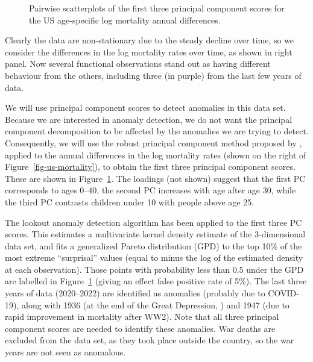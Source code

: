 \documentclass[
  11pt,
  a4paper,
]{article}
\begin{document}
\begin{figure}[!htb]


\caption{\label{fig-pca-scores}Pairwise scatterplots of the first three
principal component scores for the US age-specific log mortality annual
differences.}

\end{figure}%

Clearly the data are non-stationary due to the steady decline over time,
so we consider the differences in the log mortality rates over time, as
shown in right panel. Now several functional observations stand out as
having different behaviour from the others, including three (in purple)
from the last few years of data.

We will use principal component scores to detect anomalies in this data
set. Because we are interested in anomaly detection, we do not want the
principal component decomposition to be affected by the anomalies we are
trying to detect. Consequently, we will use the robust principal
component method proposed by \textcite{pprpca}, applied to the annual
differences in the log mortality rates (shown on the right of
Figure~\ref{fig-us-mortality}), to obtain the first three principal
component scores. These are shown in Figure~\ref{fig-pca-scores}. The
loadings (not shown) suggest that the first PC corresponds to ages
0--40, the second PC increases with age after age 30, while the third PC
contrasts children under 10 with people above age 25.

The lookout anomaly detection algorithm \autocite{lookout2021} has been
applied to the first three PC scores. This estimates a multivariate
kernel density estimate of the 3-dimensional data set, and fits a
generalized Pareto distribution (GPD) to the top 10\% of the most
extreme ``surprisal'' values (equal to minus the log of the estimated
density at each observation). Those points with probability less than
0.5 under the GPD are labelled in Figure~\ref{fig-pca-scores} (giving an
effect false positive rate of 5\%). The last three years of data
(2020--2022) are identified as anomalies (probably due to COVID-19),
along with 1936 (at the end of the Great Depression,
\textcite{tapia2009life}) and 1947 (due to rapid improvement in
mortality after WW2). Note that all three principal component scores are
needed to identify these anomalies. War deaths are excluded from the
data set, as they took place outside the country, so the war years are
not seen as anomalous.
\end{document}
